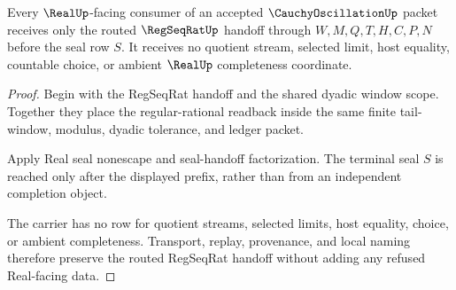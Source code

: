 \begin{theorem}
\label{thm:cauchy-oscillation-regseqrat-real-nonescape}
Every $\RealUp$-facing consumer of an accepted $\CauchyOscillationUp$ packet receives only the routed $\RegSeqRatUp$ handoff through $W,M,Q,T,H,C,P,N$ before the seal row $S$. It receives no quotient stream, selected limit, host equality, countable choice, or ambient $\RealUp$ completeness coordinate.
\end{theorem}
\begin{proof}
Begin with the RegSeqRat handoff and the shared dyadic window scope. Together they place the regular-rational readback inside the same finite tail-window, modulus, dyadic tolerance, and ledger packet.

Apply Real seal nonescape and seal-handoff factorization. The terminal seal $S$ is reached only after the displayed prefix, rather than from an independent completion object.

The carrier has no row for quotient streams, selected limits, host equality, choice, or ambient completeness. Transport, replay, provenance, and local naming therefore preserve the routed RegSeqRat handoff without adding any refused Real-facing data.
\end{proof}

